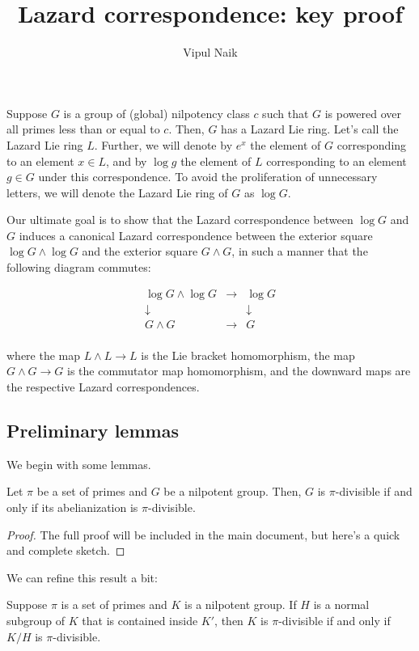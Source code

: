 \documentclass[10pt]{amsart}
\title{Lazard correspondence: key proof}
\author{Vipul Naik}
\begin{document}
\maketitle

Suppose $G$ is a group of (global) nilpotency class $c$ such that $G$
is powered over all primes less than or equal to $c$. Then, $G$ has a
Lazard Lie ring. Let's call the Lazard Lie ring $L$. Further, we will
denote by $e^x$ the element of $G$ corresponding to an element $x \in
L$, and by $\log g$ the element of $L$ corresponding to an element $g
\in G$ under this correspondence. To avoid the proliferation of
unnecessary letters, we will denote the Lazard Lie ring of $G$ as
$\log G$.

Our ultimate goal is to show that the Lazard correspondence between
$\log G$ and $G$ induces a canonical Lazard correspondence between the
exterior square $\log G \wedge \log G$ and the exterior square $G
\wedge G$, in such a manner that the following diagram commutes:

\begin{eqnarray*}
  \log G \wedge \log G & \rightarrow & \log G\\
  \downarrow & & \downarrow\\
  G \wedge G & \rightarrow & G \\
\end{eqnarray*}

where the map $L \wedge L \to L$ is the Lie bracket homomorphism, the
map $G \wedge G \to G$ is the commutator map homomorphism, and the
downward maps are the respective Lazard correspondences.

\subsection{Preliminary lemmas}

We begin with some lemmas.

\begin{lemma}
  Let $\pi$ be a set of primes and $G$ be a nilpotent group. Then, $G$
  is $\pi$-divisible if and only if its abelianization is $\pi$-divisible.
\end{lemma}

\begin{proof}
  The full proof will be included in the main document, but here's a
  quick and complete sketch.
\end{proof}

We can refine this result a bit:

\begin{lemma}
  Suppose $\pi$ is a set of primes and $K$ is a nilpotent group. If
  $H$ is a normal subgroup of $K$ that is contained inside $K'$, then
  $K$ is $\pi$-divisible if and only if $K/H$ is $\pi$-divisible.
\end{lemma}
\end{document}
